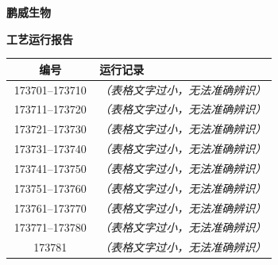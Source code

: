 \documentclass[UTF8,10pt,a4paper,fontset=fandol]{ctexart}
\begin{document}
\hfill
\begin{minipage}[t]{0.48\textwidth}
\centering
\textbf{鹏威生物}\par
\vspace{1mm}
\textbf{工艺运行报告}\par
\vspace{1mm}
\begin{tabular}{|c|p{0.67\linewidth}|}
\hline
\textbf{编号} & \textbf{运行记录} \\ \hline
173701--173710 & \textit{（表格文字过小，无法准确辨识）} \\ \hline
173711--173720 & \textit{（表格文字过小，无法准确辨识）} \\ \hline
173721--173730 & \textit{（表格文字过小，无法准确辨识）} \\ \hline
173731--173740 & \textit{（表格文字过小，无法准确辨识）} \\ \hline
173741--173750 & \textit{（表格文字过小，无法准确辨识）} \\ \hline
173751--173760 & \textit{（表格文字过小，无法准确辨识）} \\ \hline
173761--173770 & \textit{（表格文字过小，无法准确辨识）} \\ \hline
173771--173780 & \textit{（表格文字过小，无法准确辨识）} \\ \hline
173781 & \textit{（表格文字过小，无法准确辨识）} \\ \hline
\end{tabular}
\end{minipage}

\vspace{8mm}
\end{document}
